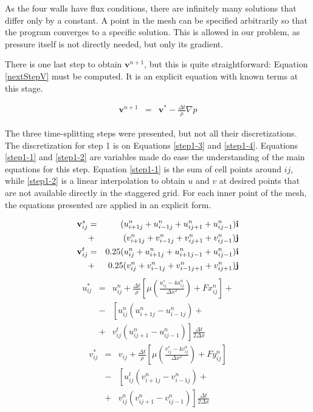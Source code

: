 \documentclass[journal]{IEEEtran}
\begin{document}
As the four walls have flux conditions, there are infinitely many solutions that differ only by a constant. A point in the mesh can be specified arbitrarily so that the program converges to a specific solution. This is allowed in our problem, as pressure itself is not directly needed, but only its gradient.

There is one last step to obtain $\mathbf{v}^{n+1}$, but this is quite straightforward: Equation \ref{nextStepV} must be computed. It is an explicit equation with known terms at this stage.

\begin{eqnarray}
	\mathbf{v}^{n+1} & = & \mathbf{v}^*  - \frac{\Delta t}{\rho} \nabla p \label{nextStepV}
\end{eqnarray}

The three time-splitting steps were presented, but not all their discretizations. The discretization for step 1 is on Equations \ref{step1-3} and \ref{step1-4}. Equations \ref{step1-1} and \ref{step1-2} are variables made do ease the understanding of the main equations for this step. Equation \ref{step1-1} is the sum of cell points around $ij$, while \ref{step1-2} is a linear interpolation to obtain $u$ and $v$ at desired points that are not available directly in the staggered grid.  For each inner point of the mesh, the equations presented are applied in an explicit form.

\begin{eqnarray}
\textbf{v}_{ij}^s&=&(\SumFour{u})\textbf{i} \nonumber \\&+& (\SumFour{v})\textbf{j} \label{step1-1}\\
\textbf{v}_{ij}^t&=&0.25(u_{ij}^n+u_{i+1j}^n+u_{i+1j-1}^n+u_{ij-1}^n)\textbf{i} \nonumber \\ &+& 0.25(v_{ij}^n+v_{i-1j}^n+v_{i-1j+1}^n+v_{ij+1}^n)\textbf{j} \label{step1-2}
\end{eqnarray}
\begin{eqnarray}
u_{ij}^{*}&=&u_{ij}^n+\frac{\Delta t}{\rho}\left[\mu\left(\frac{u_{ij}^s-4u_{ij}^n}{\Delta
x^2}\right)+Fx_{ij}^n\right] + \nonumber \\
&-&\left[u_{ij}^n(u_{i+1j}^n-u_{i-1j}^n)+ \right.\nonumber \\
&+& \left. v_{ij}^t(u_{ij+1}^n-u_{ij-1}^n)\right]\frac{\Delta t}{2\Delta x}\label{step1-3}
\end{eqnarray}
\begin{eqnarray}
v_{ij}^{*}&=&v_{ij}+\frac{\Delta t}{\rho}\left[\mu\left(\frac{v_{ij}^s-4v_{ij}^n}{\Delta
x^2}\right)+Fy_{ij}^n\right] \nonumber \\
&-&\left[u_{ij}^t (v_{i+1j}^n-v_{i-1j}^n)+ \right.\nonumber \\
&+& \left. v_{ij}^n(v_{ij+1}^n-v_{ij-1}^n)\right]\frac{\Delta t}{2\Delta x}\label{step1-4}
\end{eqnarray}
\end{document}
